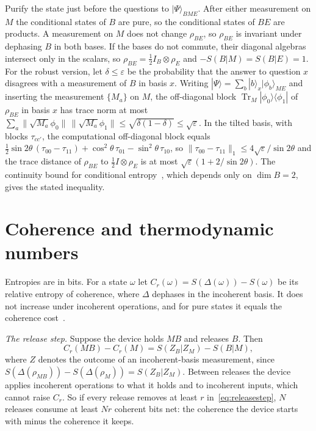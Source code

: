 \documentclass[11pt]{article}
\theoremstyle{definition}
\theoremstyle{remark}
\newcommand{\Tr}{\operatorname{Tr}}
\begin{document}
Purify the state just before the questions to $|\Psi\rangle_{BME}$. After either measurement on $M$ the conditional states of $B$ are pure, so the conditional states of $BE$ are products. A measurement on $M$ does not change $\rho_{BE}$, so $\rho_{BE}$ is invariant under dephasing $B$ in both bases. If the bases do not commute, their diagonal algebras intersect only in the scalars, so $\rho_{BE}=\tfrac12I_B\otimes\rho_E$ and $-S(B|M)=S(B|E)=1$. For the robust version, let $\delta\le\varepsilon$ be the probability that the answer to question $x$ disagrees with a measurement of $B$ in basis $x$. Writing $|\Psi\rangle=\sum_b|b\rangle_x|\phi_b\rangle_{ME}$ and inserting the measurement $\{M_a\}$ on $M$, the off-diagonal block $\Tr_M|\phi_0\rangle\langle\phi_1|$ of $\rho_{BE}$ in basis $x$ has trace norm at most $\sum_a\|\sqrt{M_a}\phi_0\|\,\|\sqrt{M_a}\phi_1\|\le\sqrt{\delta(1-\delta)}\le\sqrt\varepsilon$. In the tilted basis, with blocks $\tau_{cc'}$, the computational off-diagonal block equals $\tfrac12\sin2\theta\,(\tau_{00}-\tau_{11})+\cos^2\theta\,\tau_{01}-\sin^2\theta\,\tau_{10}$, so $\|\tau_{00}-\tau_{11}\|_1\le4\sqrt\varepsilon/\sin2\theta$ and the trace distance of $\rho_{BE}$ to $\tfrac12I\otimes\rho_E$ is at most $\sqrt\varepsilon(1+2/\sin2\theta)$. The continuity bound for conditional entropy~\cite{Winter16}, which depends only on $\dim B=2$, gives the stated inequality.

\section{Coherence and thermodynamic numbers}\label{app:numbers}

Entropies are in bits. For a state $\omega$ let $C_r(\omega)=S(\Delta(\omega))-S(\omega)$ be its relative entropy of coherence, where $\Delta$ dephases in the incoherent basis. It does not increase under incoherent operations, and for pure states it equals the coherence cost~\cite{BCP14,WinterYang16}.

\emph{The release step.} Suppose the device holds $MB$ and releases $B$. Then
\begin{equation}\label{eq:releasestep}
C_r(MB)-C_r(M)=S(Z_B|Z_M)-S(B|M),
\end{equation}
where $Z$ denotes the outcome of an incoherent-basis measurement, since $S(\Delta(\rho_{MB}))-S(\Delta(\rho_M))=S(Z_B|Z_M)$. Between releases the device applies incoherent operations to what it holds and to incoherent inputs, which cannot raise $C_r$. So if every release removes at least $r$ in~\eqref{eq:releasestep}, $N$ releases consume at least $Nr$ coherent bits net: the coherence the device starts with minus the coherence it keeps.
\end{document}
